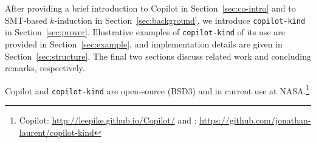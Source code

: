 After providing a brief introduction to Copilot in Section~\ref{sec:co-intro}
and to SMT-based $k$-induction in Section~\ref{sec:background}, we introduce
\texttt{copilot-kind} in Section~\ref{sec:prover}. Illustrative examples of
\texttt{copilot-kind} of its use are provided in Section~\ref{sec:example}, and
implementation details are given in Section~\ref{sec:structure}. The final two
sections discuss related work and concluding remarks, respectively.

Copilot and \texttt{copilot-kind} are open-source (BSD3) and in current use at
NASA.\footnote{Copilot: \url{http://leepike.github.io/Copilot/} and
: \url{https://github.com/jonathan-laurent/copilot-kind}}








  







